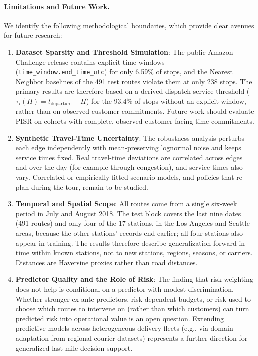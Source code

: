 \documentclass[11pt,a4paper]{article}
\begin{document}
\paragraph{Limitations and Future Work.}
We identify the following methodological boundaries, which provide clear avenues for future research:
\begin{enumerate}
    \item \textbf{Dataset Sparsity and Threshold Simulation}: The public Amazon Challenge release contains explicit time windows (\texttt{time\_window.end\_time\_utc}) for only 6.59\% of stops, and the Nearest Neighbor baselines of the 491 test routes violate them at only 238 stops. The primary results are therefore based on a derived dispatch service threshold ($\tau_i(H) = t_{\text{departure}} + H$) for the 93.4\% of stops without an explicit window, rather than on observed customer commitments. Future work should evaluate PISR on cohorts with complete, observed customer-facing time commitments.
    \item \textbf{Synthetic Travel-Time Uncertainty}: The robustness analysis perturbs each edge independently with mean-preserving lognormal noise and keeps service times fixed. Real travel-time deviations are correlated across edges and over the day (for example through congestion), and service times also vary. Correlated or empirically fitted scenario models, and policies that re-plan during the tour, remain to be studied.
    \item \textbf{Temporal and Spatial Scope}: All routes come from a single six-week period in July and August 2018. The test block covers the last nine dates (491 routes) and only four of the 17 stations, in the Los Angeles and Seattle areas, because the other stations' records end earlier; all four stations also appear in training. The results therefore describe generalization forward in time within known stations, not to new stations, regions, seasons, or carriers. Distances are Haversine proxies rather than road distances.
    \item \textbf{Predictor Quality and the Role of Risk}: The finding that risk weighting does not help is conditional on a predictor with modest discrimination. Whether stronger ex-ante predictors, risk-dependent budgets, or risk used to choose which routes to intervene on (rather than which customers) can turn predicted risk into operational value is an open question. Extending predictive models across heterogeneous delivery fleets (e.g., via domain adaptation from regional courier datasets) represents a further direction for generalized last-mile decision support.
\end{enumerate}
\end{document}
